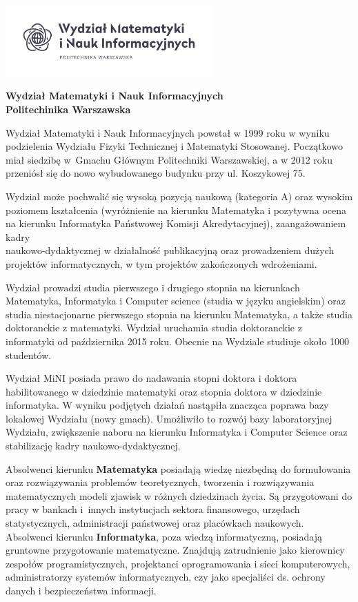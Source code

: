 \documentclass[\main/boa.tex]{subfiles}
\begin{document}
	\begin{minipage}[t]{0.915\textwidth}
		\center     
		\includegraphics[width=300px]{img/logos.bw/mini_nowe.png} 
	\end{minipage}

\begin{center}
\Large \textbf {Wydział Matematyki i Nauk Informacyjnych \\ Politechinika Warszawska}
\end{center}

\vskip 0.3cm
\normalsize 

Wydział Matematyki i Nauk Informacyjnych powstał w 1999 roku w wyniku podzielenia Wydziału Fizyki Technicznej i Matematyki Stosowanej. Początkowo miał siedzibę w~Gmachu Głównym Politechniki Warszawskiej, a w 2012 roku przeniósł się do nowo wybudowanego budynku przy ul. Koszykowej 75.

Wydział może pochwalić się wysoką pozycją naukową (kategoria A) oraz wysokim poziomem kształcenia (wyróżnienie na kierunku Matematyka i pozytywna ocena na kierunku Informatyka Państwowej Komisji Akredytacyjnej), zaangażowaniem kadry \\ naukowo-dydaktycznej w działalność publikacyjną oraz prowadzeniem dużych projektów informatycznych, w tym projektów zakończonych wdrożeniami.

Wydział prowadzi studia pierwszego i drugiego stopnia na kierunkach Matematyka, Informatyka i Computer science (studia w języku angielskim) oraz studia niestacjonarne pierwszego stopnia na kierunku Matematyka, a także studia doktoranckie z matematyki. Wydział uruchamia studia doktoranckie z informatyki od października 2015 roku. Obecnie na Wydziale studiuje około 1000 studentów.

Wydział MiNI posiada prawo do nadawania stopni doktora i doktora habilitowanego w dziedzinie matematyki oraz stopnia doktora w dziedzinie informatyka. W wyniku podjętych działań nastąpiła znacząca poprawa bazy lokalowej Wydziału (nowy gmach). Umożliwiło to rozwój bazy laboratoryjnej Wydziału, zwiększenie naboru na kierunku Informatyka i Computer Science oraz stabilizację kadry naukowo-dydaktycznej.

Absolwenci kierunku \textbf{Matematyka} posiadają wiedzę niezbędną do formułowania oraz rozwiązywania problemów teoretycznych, tworzenia i rozwiązywania matematycznych modeli zjawisk w różnych dziedzinach życia. Są przygotowani do pracy w bankach i~innych instytucjach sektora finansowego, urzędach statystycznych, administracji państwowej oraz placówkach naukowych. Absolwenci kierunku \textbf{Informatyka}, poza wiedzą informatyczną, posiadają gruntowne przygotowanie matematyczne. Znajdują zatrudnienie jako kierownicy zespołów programistycznych, projektanci oprogramowania i sieci komputerowych, administratorzy systemów informatycznych, czy jako specjaliści ds. ochrony danych i bezpieczeństwa informacji.
\end{document}
